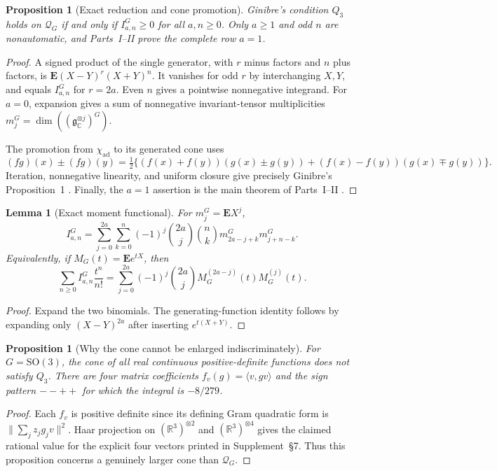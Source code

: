 \documentclass[10pt,reqno]{amsart}
\newtheorem{proposition}[theorem]{Proposition}
\newtheorem{lemma}[theorem]{Lemma}
\theoremstyle{definition}
\newcommand{\chiad}{\chi_{\mathrm{ad}}}
\newcommand{\Qcone}{\mathcal Q}
\begin{document}
\begin{proposition}[Exact reduction and cone promotion]
\label{prop:reduction}
Ginibre's condition $Q_3$ holds on $\Qcone_G$ if and only if
$I^G_{a,n}\geq0$ for all $a,n\geq0$.  Only $a\geq1$ and odd $n$ are
nonautomatic, and Parts~I--II prove the complete row $a=1$.
\end{proposition}

\begin{proof}
A signed product of the single generator, with $r$ minus factors and $n$
plus factors, is $\mathbf E(X-Y)^r(X+Y)^n$.  It vanishes for odd $r$ by
interchanging $X,Y$, and equals $I^G_{a,n}$ for $r=2a$.  Even $n$ gives a
pointwise nonnegative integrand.  For $a=0$, expansion gives a sum of
nonnegative invariant-tensor multiplicities
$m_j^G=\dim((\mathfrak g_{\mathbb C}^{\otimes j})^G)$.

The promotion from $\chiad$ to its generated cone uses
\[
 (fg)(x)\mathbin\pm(fg)(y)=\tfrac12\{(f(x)+f(y))(g(x)\mathbin\pm g(y))
 +(f(x)-f(y))(g(x)\mathbin\mp g(y))\}.
\]
Iteration, nonnegative linearity, and uniform closure give precisely
Ginibre's Proposition~1 \cite{Ginibre1970}.  Finally, the $a=1$ assertion is
the main theorem of Parts~I--II \cite{AdjointTwoMinus}.
\end{proof}

\begin{lemma}[Exact moment functional]
\label{lem:moment}
For $m_j^G=\mathbf E X^j$,
\[
 I^G_{a,n}=\sum_{j=0}^{2a}\sum_{k=0}^{n}(-1)^j
 \binom{2a}{j}\binom{n}{k}m^G_{2a-j+k}m^G_{j+n-k}.
\]
Equivalently, if $M_G(t)=\mathbf E e^{tX}$, then
\[
 \sum_{n\geq0}I^G_{a,n}\frac{t^n}{n!}
 =\sum_{j=0}^{2a}(-1)^j\binom{2a}{j}
 M_G^{(2a-j)}(t)M_G^{(j)}(t).
\]
\end{lemma}

\begin{proof}
Expand the two binomials.  The generating-function identity follows by
expanding only $(X-Y)^{2a}$ after inserting $e^{t(X+Y)}$.
\end{proof}

\begin{proposition}[Why the cone cannot be enlarged indiscriminately]
For $G=\mathrm{SO}(3)$, the cone of all real continuous positive-definite
functions does not satisfy $Q_3$.  There are four matrix coefficients
$f_v(g)=\langle v,gv\rangle$ and the sign pattern $--++$ for which the
integral is $-8/279$.
\end{proposition}

\begin{proof}
Each $f_v$ is positive definite since its defining Gram quadratic form is
$\|\sum_j z_jg_jv\|^2$.  Haar projection on
$(\mathbb R^3)^{\otimes2}$ and $(\mathbb R^3)^{\otimes4}$ gives the claimed
rational value for the explicit four vectors printed in Supplement~\S7.
Thus this proposition concerns a genuinely larger cone than $\Qcone_G$.
\end{proof}
\end{document}
